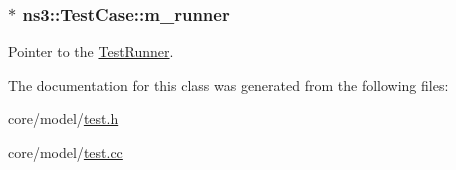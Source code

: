\subsubsection[{\texorpdfstring{m\+\_\+runner}{m_runner}}]{$\ast$ ns3\+::\+Test\+Case\+::m\+\_\+runner\hspace{0.3cm}{\ttfamily [private]}}\hypertarget{classns3_1_1TestCase_a8baa7a1fedd4916eb63c45a7597de67a}{}\label{classns3_1_1TestCase_a8baa7a1fedd4916eb63c45a7597de67a}


Pointer to the \hyperlink{classns3_1_1TestRunner}{Test\+Runner}. 



The documentation for this class was generated from the following files\+:\begin{DoxyCompactItemize}
\item 
core/model/\hyperlink{test_8h}{test.\+h}\item 
core/model/\hyperlink{test_8cc}{test.\+cc}\end{DoxyCompactItemize}
